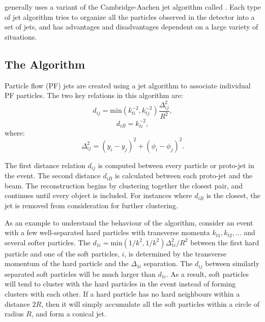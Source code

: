 \CMS generally uses a variant of the Cambridge-Aachen jet algorithm called \antikt. Each type of jet algorithm tries to organize all the particles observed in the detector into a set of jets, and has advantages and disadvantages dependent on a large variety of situations. 

%

\subsection{The \antikt Algorithm}
Particle flow (PF) jets are created using a jet algorithm to associate individual PF particles. The two key relations in this algorithm are:
\begin{equation}
    d_{ij} = \mathrm{min}\left(k^{-2}_{ti},k^{-2}_{tj}\right)
    \frac{\Delta_{ij}^{2} }{R^{2}},
\end{equation}
\begin{equation}
    d_{iB} = k^{-2}_{ti},
\end{equation}
where:
\begin{equation}
\Delta^{2}_{ij} = \left(y_{i} − y_{j}\right)^{2} + \left(\phi_{i} − \phi_{j}\right)^{2}.
\end{equation}

The first distance relation $d_{ij}$ is computed between every particle or proto-jet in the event. The second distance $d_{iB}$ is calculated between each proto-jet and the beam. The reconstruction begins by clustering together the closest pair, and continues until every object is included. For instances where $d_{iB}$ is the closest, the jet is removed from consideration for further clustering.

As an example to understand the behaviour of the \antikt algorithm, consider an event with a few well-separated hard particles with transverse momenta $k_{t1}, k_{t2}, . . .$ and several softer particles. The $d_{1i} =\mathrm{min}\left(1/k^{2} , 1/k^{2} \right)\Delta^{2}_{1i} /R^{2}$ between the first hard particle and one of the soft particles, $i$, is determined by the transverse momentum of the hard particle and the $\Delta_{1i}$ separation. The $d_{ij}$ between similarly separated soft particles will be much larger than $d_{1i}$. As a result, soft particles will tend to cluster with the hard particles in the event instead of forming clusters with each other. If a hard particle has no hard neighbours within a distance $2R$, then it will simply accumulate all the soft particles within a circle of radius $R$, and form a conical jet.

